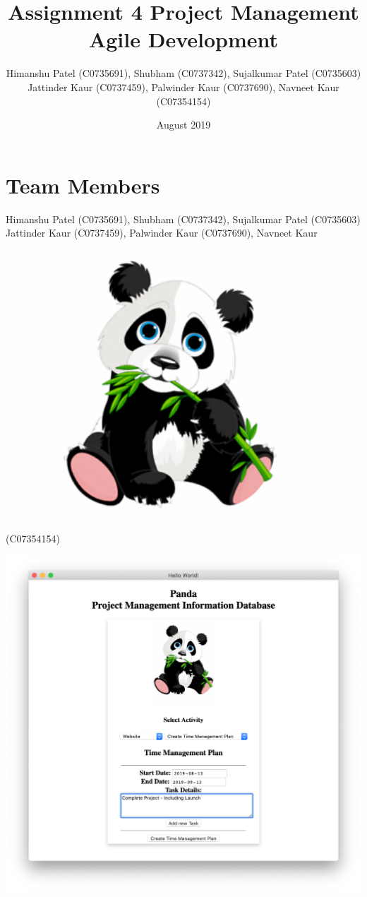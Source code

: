 \documentclass{article}
\title{Assignment 4 Project Management Agile Development}
\author{Himanshu Patel (C0735691), Shubham (C0737342), Sujalkumar Patel (C0735603)\\Jattinder Kaur (C0737459), Palwinder Kaur (C0737690), Navneet Kaur (C07354154)}
\date{August 2019}
\begin{document}
\maketitle

\section{Team Members}
Himanshu Patel (C0735691), Shubham (C0737342), Sujalkumar Patel (C0735603)\\Jattinder Kaur (C0737459), Palwinder Kaur (C0737690), Navneet Kaur (C07354154)
\includegraphics[width=8cm]{panda.png}

\includegraphics[width=16cm]{screenshot.png}
\end{document}
